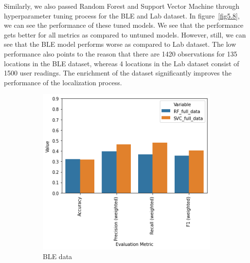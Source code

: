 \documentclass[a4paper,singleside,12pt]{report} %
\begin{document}
			Similarly, we also passed Random Forest and Support Vector Machine through hyperparameter tuning process for the BLE and Lab dataset. 
			In figure~\ref{fig5.8}, we can see the performance of these tuned models. 
			We see that the performance gets better for all metrics as compared to untuned models. 
			However, still, we can see that the BLE model performs worse as compared to Lab dataset. 
			The low performance also points to the reason that there are 1420 observations for 135 locations in the BLE dataset, whereas 4 locations in the Lab dataset consist of 1500 user readings. 
			The enrichment of the dataset significantly improves the performance of the localization process. 
			
			
			\begin{figure}[!htb]
			  \centering
			  \begin{subfigure}[b]{0.48\linewidth}
			    \includegraphics[width=\linewidth]{./figures/final_results_comparison_ble.png}
			     \caption{BLE data}
			  \end{subfigure}
			  \begin{subfigure}[b]{0.48\linewidth}

\end{subfigure}
\end{figure}
\end{document}
